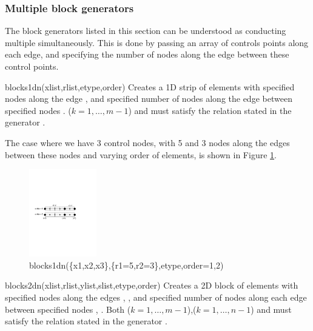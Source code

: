 \subsubsection{Multiple block generators}
The block generators listed in this section can be understood 
as conducting multiple  simultaneously.
This is done by passing an array of controls points along each edge,
and specifying the number of nodes along the edge between these
control points.
\begin{codelist}
  \item[blocks1dn(xlist,rlist,etype,order)]
    Creates a 1D strip of elements with specified nodes
    along the edge , and specified
    number of nodes along the edge between specified nodes
                   .
    ($k=1,\ldots,m-1$) and  must satisfy the 
    relation stated in the generator . 

    The case where we have 3 control nodes, with 5 and 3 nodes along
    the edges between these nodes and varying order of elements, 
    is shown in Figure \ref{fig:Blocks1dn}.
    \begin{figure}[htbp]
    \centering
    \includegraphics[trim=0.0in 4.5in 2.0in 4.2in, clip, height=1.5in]{fig/blocks1dn.pdf}
    \caption{blocks1dn(\{x1,x2,x3\},\{r1=5,r2=3\},etype,order=1,2)}
    \label{fig:Blocks1dn}
    \end{figure}

  \item[blocks2dn(xlist,rlist,ylist,slist,etype,order)]
    Creates a 2D block of elements with specified nodes
    along the edges 
    , 
    , and specified
    number of nodes along each edge between specified nodes
                   ,
                   .
    Both ($k=1,\ldots,m-1$),($k=1,\ldots,n-1$) 
    and  must satisfy the relation stated in the generator 
    . 


\end{codelist}
